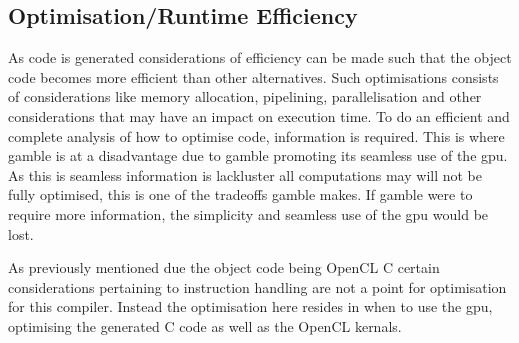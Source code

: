 \subsection*{Optimisation/Runtime Efficiency}
As code is generated considerations of efficiency can be made such that the object code becomes more efficient than other alternatives.
Such optimisations consists of considerations like memory allocation, pipelining, parallelisation and other considerations that may have an impact on execution time.
To do an efficient and complete analysis of how to optimise code, information is required.
This is where \gls{gamble} is at a disadvantage due to \gls{gamble} promoting its seamless use of the \acrshort{gpu}.
As this is seamless information is lackluster all computations may will not be fully optimised, this is one of the tradeoffs \gls{gamble} makes.
If \gls{gamble} were to require more information, the simplicity and seamless use of the \acrshort{gpu} would be lost.

As previously mentioned due the object code being OpenCL C certain considerations pertaining to instruction handling are not a point for optimisation for this compiler.
Instead the optimisation here resides in when to use the \acrshort{gpu}, optimising the generated C code as well as the OpenCL kernals.




